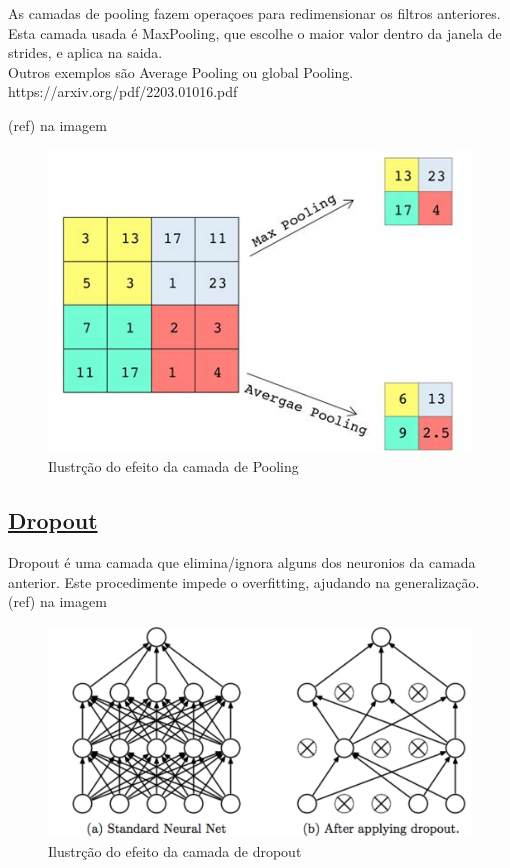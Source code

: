 As camadas de pooling fazem operaçoes para redimensionar os filtros anteriores. \\
Esta camada usada é MaxPooling, que escolhe o maior valor dentro da janela de strides, e aplica na saida. \\
Outros exemplos são Average Pooling ou global Pooling. \\
https://arxiv.org/pdf/2203.01016.pdf

(ref) na imagem
\begin{figure}[H]
	\centering
	\includegraphics{Imagens/pooling.jpg}
	\caption{Ilustrção do efeito da camada de Pooling}
	\label{fig:pooling}
\end{figure}


\subsection{\href{https://keras.io/api/layers/regularization_layers/dropout/}{Dropout}\label{se:dropout}}

Dropout é uma camada que elimina/ignora alguns dos neuronios da camada anterior. Este procedimente impede o overfitting, ajudando na generalização. \\
(ref) na imagem
\begin{figure}[H]
	\centering
	\includegraphics{Imagens/dropout.png}
	\caption{Ilustrção do efeito da camada de dropout}
	\label{fig:dropout}
\end{figure}



